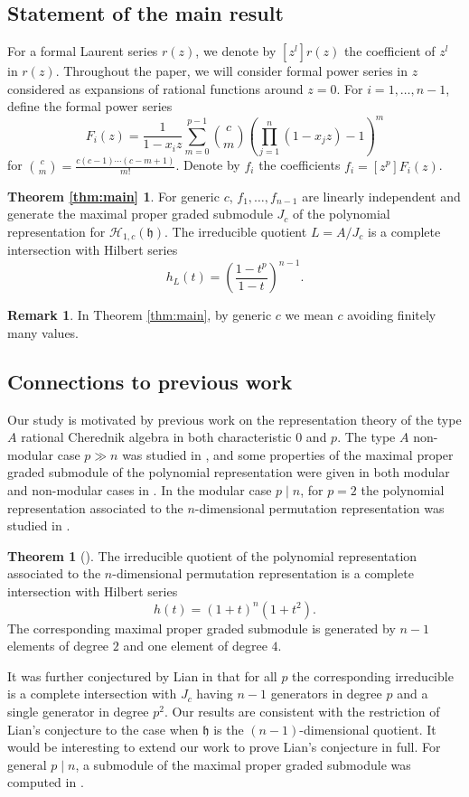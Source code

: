 \documentclass{elsarticle}
\numberwithin{equation}{section}
\theoremstyle{definition}
\newtheorem{theorem}{Theorem}[section]
\newtheorem*{remark}{Remark}
\newcommand{\h}{\mathfrak{h}}
\newcommand{\HH}{\mathcal{H}}
\begin{document}
\subsection{Statement of the main result}

For a formal Laurent series $r(z)$, we denote by $[z^l] r(z)$ the coefficient of $z^l$ in $r(z)$.  Throughout the paper, we will consider formal power series in $z$ considered as expansions of rational functions around $z = 0$. For $i = 1, \ldots, n - 1$, define the formal power series
\[
F_i(z)=\frac{1}{1-x_iz} \sum_{m=0}^{p-1} \binom{c}{m}\left(\prod_{j=1}^{n} (1-x_jz) - 1\right)^m
\]
for $\binom{c}{m} = \frac{c (c - 1) \cdots (c - m + 1)}{m!}$.  Denote by $f_i$ the coefficients $f_i = [z^p] F_i(z)$.

\newtheorem*{thm:main}{Theorem \ref{thm:main}} \begin{thm:main}
For generic $c$, $f_1, \ldots, f_{n-1}$ are linearly independent and generate the maximal proper graded submodule $J_c$ of the polynomial representation for $\HH_{1, c}(\h)$.  The irreducible quotient $L = A/J_c$ is a complete intersection with Hilbert series 
\[
h_L(t) = \left(\frac{1-t^p}{1-t}\right)^{n-1}.
\]
\end{thm:main}
\begin{remark}
In Theorem \ref{thm:main}, by generic $c$ we mean $c$ avoiding finitely many values.
\end{remark}

\subsection{Connections to previous work}

Our study is motivated by previous work on the representation theory of the type $A$ rational Cherednik algebra in both characteristic $0$ and $p$.  The type $A$ non-modular case $p \gg n$ was studied in \cite{BFG}, and some properties of the maximal proper graded submodule of the polynomial representation were given in both modular and non-modular cases in \cite{BC1}.  In the modular case $p \mid n$, for $p = 2$ the polynomial representation associated to the $n$-dimensional permutation representation was studied in \cite{L}.
\begin{theorem}[{\cite[Theorem 5.1]{L}}] \label{thm:lian}
The irreducible quotient of the polynomial representation associated to the $n$-dimensional permutation representation is a complete intersection with Hilbert series
\[
h(t) = (1 + t)^n (1 + t^2).
\]
The corresponding maximal proper graded submodule is generated by $n - 1$ elements of degree $2$ and one element of degree $4$. 
\end{theorem} 
It was further conjectured by Lian in \cite[Conjecture 5.2]{L} that for all $p$ the corresponding irreducible is a complete intersection with $J_c$ having $n - 1$ generators in degree $p$ and a single generator in degree $p^2$.  Our results are consistent with the restriction of Lian's conjecture to the case when $\h$ is the $(n - 1)$-dimensional quotient.  It would be interesting to extend our work to prove Lian's conjecture in full.  For general $p \mid n$, a submodule of the maximal proper graded submodule was computed in \cite[Proposition 6.1]{DS}.
\end{document}
